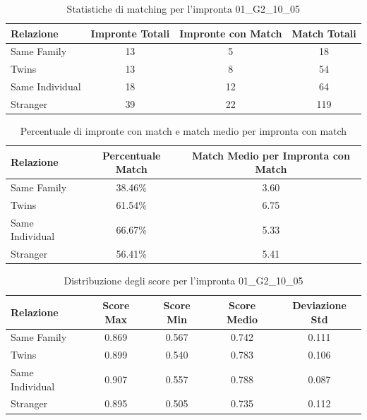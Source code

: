 \begin{table}[htbp]
\centering
\caption{Statistiche di matching per l'impronta 01\_G2\_10\_05}
\label{tab:results_01_G2_10_05}
\begin{tabular}{|l|c|c|c|}
\hline
\textbf{Relazione} & \textbf{Impronte Totali} & \textbf{Impronte con Match} & \textbf{Match Totali} \\
\hline
Same Family & 13 & 5 & 18 \\
\hline
Twins & 13 & 8 & 54 \\
\hline
Same Individual & 18 & 12 & 64 \\
\hline
Stranger & 39 & 22 & 119 \\
\hline
\end{tabular}
\end{table}


\begin{table}[htbp]
\centering
\caption{Percentuale di impronte con match e match medio per impronta con match}
\label{tab:match_percentage_01_G2_10_05}
\begin{tabular}{|l|c|c|}
\hline
\textbf{Relazione} & \textbf{Percentuale Match} & \textbf{Match Medio per Impronta con Match} \\
\hline
Same Family & 38.46\% & 3.60 \\
\hline
Twins & 61.54\% & 6.75 \\
\hline
Same Individual & 66.67\% & 5.33 \\
\hline
Stranger & 56.41\% & 5.41 \\
\hline
\end{tabular}
\end{table}


\begin{table}[htbp]
\centering
\caption{Distribuzione degli score per l'impronta 01\_G2\_10\_05}
\label{tab:scores_01_G2_10_05}
\begin{tabular}{|l|c|c|c|c|}
\hline
\textbf{Relazione} & \textbf{Score Max} & \textbf{Score Min} & \textbf{Score Medio} & \textbf{Deviazione Std} \\
\hline
Same Family & 0.869 & 0.567 & 0.742 & 0.111 \\
\hline
Twins & 0.899 & 0.540 & 0.783 & 0.106 \\
\hline
Same Individual & 0.907 & 0.557 & 0.788 & 0.087 \\
\hline
Stranger & 0.895 & 0.505 & 0.735 & 0.112 \\
\hline
\end{tabular}
\end{table}

